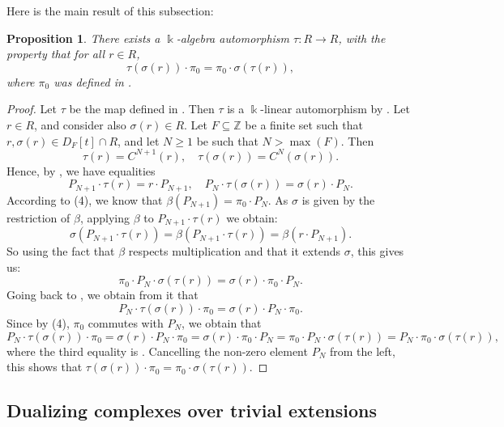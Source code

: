 \documentclass{amsart}
\newtheorem{prop}[equation]{Proposition}
\theoremstyle{definition}
\renewcommand{\k}{\Bbbk}
\numberwithin{equation}{section}
\begin{document}
Here is the main result of this subsection:
\begin{prop}\label{prop:main-tausigma}
There exists a $\k$-algebra automorphism $\tau:R \to R$,
with the property that for all $r \in R$,
\[
\tau(\sigma(r)) \cdot \pi_0 = \pi_0 \cdot \sigma(\tau(r)),
\]
where $\pi_0$ was defined in .
\end{prop}
\begin{proof}
Let $\tau$ be the map defined in .
Then $\tau$ is a $\k$-linear automorphism by .
Let $r \in R$, and consider also $\sigma(r) \in R$.
Let $F \subseteq \mathbb{Z}$ be a finite set such that $r,\sigma(r) \in D_F[t] \cap R$,
and let $N \ge 1$ be such that $N > \max(F)$.
Then 
\[
\tau(r) = C^{N+1}(r), \quad \tau(\sigma(r)) = C^{N}(\sigma(r)).
\]
Hence, by ,
we have equalities
\begin{equation}\label{eqn:ptaursigma}
P_{N+1} \cdot \tau(r) = r \cdot P_{N+1} ,\quad P_N \cdot \tau(\sigma(r)) = \sigma(r) \cdot P_N.
\end{equation}
According to (4), we know that $\beta(P_{N+1}) =\pi_0 \cdot P_N$.
As $\sigma$ is given by the restriction of $\beta$,
applying $\beta$ to $P_{N+1} \cdot \tau(r)$ we obtain:
\[
\sigma(P_{N+1} \cdot \tau(r)) =  \beta(P_{N+1} \cdot \tau(r)) = \beta(r\cdot P_{N+1}).
\]
So using the fact that $\beta$ respects multiplication and that it extends $\sigma$, this gives us:
\begin{equation}\label{eqn:beforesigtau}
\pi_0 \cdot P_N \cdot \sigma(\tau(r)) = \sigma(r) \cdot \pi_0 \cdot P_N.
\end{equation}
Going back to , we obtain from it that
\[
P_N \cdot \tau(\sigma(r)) \cdot \pi_0 = \sigma(r) \cdot P_N \cdot \pi_0.
\]
Since by (4), $\pi_0$ commutes with $P_N$, 
we obtain that
\[
P_N \cdot \tau(\sigma(r)) \cdot \pi_0 = \sigma(r) \cdot P_N \cdot \pi_0 = \sigma(r) \cdot \pi_0 \cdot P_N = \pi_0 \cdot P_N \cdot \sigma(\tau(r)) = P_N \cdot \pi_0 \cdot \sigma(\tau(r)),
\]
where the third equality is .
Cancelling the non-zero element $P_N$ from the left,
this shows that $\tau(\sigma(r)) \cdot \pi_0 = \pi_0 \cdot \sigma(\tau(r))$.
\end{proof}

\subsection{Dualizing complexes over trivial extensions}
\end{document}
